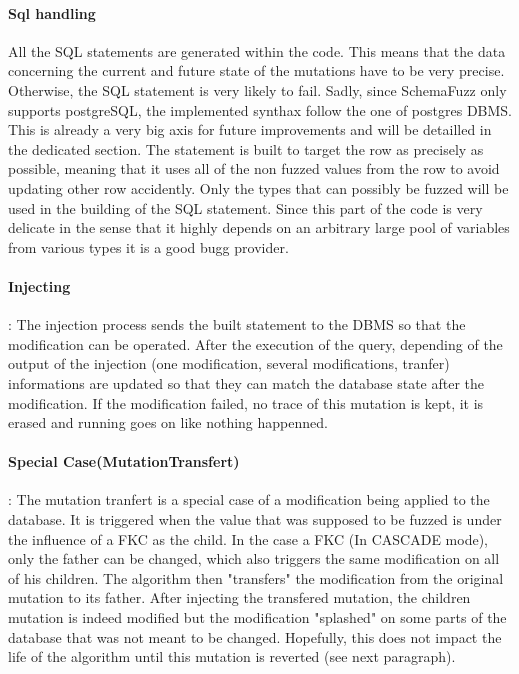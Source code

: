 \documentclass{article}
\begin{document}
\begin{empfile}
				\paragraph{Sql handling}
All the SQL statements are generated within the code. This means that the data concerning the current and future state of the mutations have to be very precise. Otherwise, the SQL statement is very likely to fail. Sadly, since SchemaFuzz only supports postgreSQL, the implemented synthax follow the one of postgres
DBMS. This is already a very big axis for future improvements and will be detailled in the dedicated section.
The statement is built to target the row as precisely as possible, meaning that it uses all of the non fuzzed values from the row to avoid updating other row accidently. Only the types that can possibly be fuzzed will be used in the building of the SQL statement. Since this part of the code is very delicate in the sense that it highly depends on an arbitrary large pool of variables from various types it is a good bugg provider. 
				
				\paragraph{Injecting} :
The injection process sends the built statement to the DBMS so that the modification can be operated. After the execution of the query, depending of the output of the injection (one modification, several modifications, tranfer) informations are updated so that they can match the database state after the modification. If the modification failed, no trace of this mutation is kept, it is erased and running goes on like nothing happenned.  				
				\paragraph{Special Case(MutationTransfert)} :
The mutation tranfert is a special case of a modification being applied to the database.
It is triggered when the value that was supposed to be fuzzed is under the influence of a FKC as the child.
In the case a FKC (In CASCADE mode), only the father can be changed, which also triggers the same modification on all of his children. The algorithm then "transfers" the modification from the original mutation to its father.
After injecting the transfered mutation, the children mutation is indeed modified but the modification "splashed" on some parts of the database that was not meant to be changed.
Hopefully, this does not impact the life of the algorithm until this mutation is reverted (see next paragraph).

\end{empfile}
\end{document}
